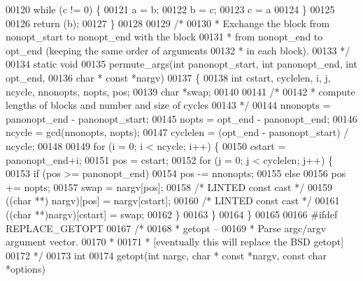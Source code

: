 \begin{DoxyCode}
{{{{{{{00120     \textcolor{keywordflow}{while} (c != 0) \{
00121         a = b;
00122         b = c;
00123         c = a %
00124     \}
00125 
00126     \textcolor{keywordflow}{return} (b);
00127 \}
00128 
00129 \textcolor{comment}{/*}
00130 \textcolor{comment}{ * Exchange the block from nonopt\_start to nonopt\_end with the block}
00131 \textcolor{comment}{ * from nonopt\_end to opt\_end (keeping the same order of arguments}
00132 \textcolor{comment}{ * in each block).}
00133 \textcolor{comment}{ */}
00134 \textcolor{keyword}{static} \textcolor{keywordtype}{void}
00135 permute_args(\textcolor{keywordtype}{int} panonopt\_start, \textcolor{keywordtype}{int} panonopt\_end, \textcolor{keywordtype}{int} opt\_end,
00136     \textcolor{keywordtype}{char} * \textcolor{keyword}{const} *nargv)
00137 \{
00138     \textcolor{keywordtype}{int} cstart, cyclelen, i, j, ncycle, nnonopts, nopts, pos;
00139     \textcolor{keywordtype}{char} *swap;
00140 
00141     \textcolor{comment}{/*}
00142 \textcolor{comment}{     * compute lengths of blocks and number and size of cycles}
00143 \textcolor{comment}{     */}
00144     nnonopts = panonopt\_end - panonopt\_start;
00145     nopts = opt\_end - panonopt\_end;
00146     ncycle = gcd(nnonopts, nopts);
00147     cyclelen = (opt\_end - panonopt\_start) / ncycle;
00148 
00149     \textcolor{keywordflow}{for} (i = 0; i < ncycle; i++) \{
00150         cstart = panonopt\_end+i;
00151         pos = cstart;
00152         \textcolor{keywordflow}{for} (j = 0; j < cyclelen; j++) \{
00153             \textcolor{keywordflow}{if} (pos >= panonopt\_end)
00154                 pos -= nnonopts;
00155             \textcolor{keywordflow}{else}
00156                 pos += nopts;
00157             swap = nargv[pos];
00158             \textcolor{comment}{/* LINTED const cast */}
00159             ((\textcolor{keywordtype}{char} **) nargv)[pos] = nargv[cstart];
00160             \textcolor{comment}{/* LINTED const cast */}
00161             ((\textcolor{keywordtype}{char} **)nargv)[cstart] = swap;
00162         \}
00163     \}
00164 \}
00165 
00166 \textcolor{preprocessor}{#ifdef REPLACE\_GETOPT}
00167 \textcolor{comment}{/*}
00168 \textcolor{comment}{ * getopt --}
00169 \textcolor{comment}{ *  Parse argc/argv argument vector.}
00170 \textcolor{comment}{ *}
00171 \textcolor{comment}{ * [eventually this will replace the BSD getopt]}
00172 \textcolor{comment}{ */}
00173 \textcolor{keywordtype}{int}
00174 getopt(\textcolor{keywordtype}{int} nargc, \textcolor{keywordtype}{char} * \textcolor{keyword}{const} *nargv, \textcolor{keyword}{const} \textcolor{keywordtype}{char} *options)
}}}}}}}
\end{DoxyCode}

